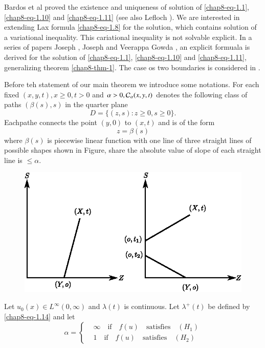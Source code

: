 Bardos et al \cite{chap8-key1} proved the existence and uniqueness of solution of \eqref{chap8-eq-1.1}, \eqref{chap8-eq-1.10} and \eqref{chap8-eq-1.11} (see also Lefloch \cite{chap8-key10}). We are interested in extending Lax formula \eqref{chap8-eq-1.8} for the solution, which contains solution of a variational inequality. This cariational inequality is not solvable explicit. In a series of papers Joseph \cite{chap8-key3}, Joseph and Veerappa Gowda
\cite{chap8-key4, chap8-key5}, an explicit formuala is derived for the solution of \eqref{chap8-eq-1.1}, \eqref{chap8-eq-1.10}
and \eqref{chap8-eq-1.11}, generalizing theorem \ref{chap8-thm-1}. The case os two boundaries is considered in
\cite{chap8-key6}.

Before teh statement of our main theorem we introduce some notations. For each fixed $(x,y,t),x \geq 0, t > 0$ and $\alpha > 0, \mathcal{C}_{\alpha}(x,y,t)$ denotes the following class of paths $(\beta(s), s)$ in the quarter plane
$$
D = \{(z,s): z\geq 0, s \geq 0\}.
$$
Each\pageoriginale pathe connects the point $(y,0)$ to $(x,t)$ and is of the form
$$
z=\beta(s)
$$
where $\beta(s)$ is piecewise linear function with one line of three straight lines of possible shapes shown in Figure, share the absolute value of slope of each straight line is $\leq \alpha$.
\begin{figure}[H]
\centering
\includegraphics[scale=0.7]{src/figures/figure-art8.eps}
\end{figure}
 Let $u_{0}(x)\in L^{\infty}(0,\infty)$ and $\lambda(t)$ is continuous. Let $\lambda^{+}(t)$ be defined by
 \eqref{chap8-eq-1.14} and let
 \begin{equation}\label{chap8-eq-1.16}
 \alpha =\left\{
 \begin{aligned}
&\infty \quad\text{if}\quad f(u)\quad \text{satisfies}\quad (H_{1})\\
&1\quad  \text{if}\quad f(u)\quad \text{satisfies}\quad (H_{2})
 \end{aligned}
\right.
 \end{equation}
